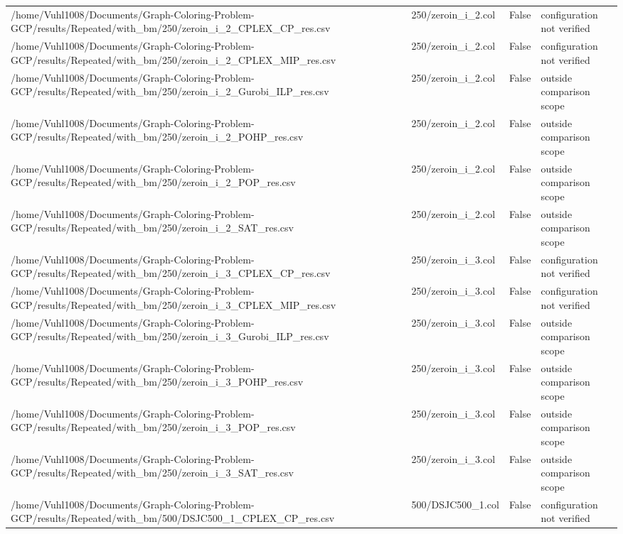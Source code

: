 \begin{table}[htbp]
\begin{tabular}{llll}
/home/Vuhl1008/Documents/Graph-Coloring-Problem-GCP/results/Repeated/with\_bm/250/zeroin\_i\_2\_CPLEX\_CP\_res.csv & 250/zeroin\_i\_2.col & False & configuration not verified \\
/home/Vuhl1008/Documents/Graph-Coloring-Problem-GCP/results/Repeated/with\_bm/250/zeroin\_i\_2\_CPLEX\_MIP\_res.csv & 250/zeroin\_i\_2.col & False & configuration not verified \\
/home/Vuhl1008/Documents/Graph-Coloring-Problem-GCP/results/Repeated/with\_bm/250/zeroin\_i\_2\_Gurobi\_ILP\_res.csv & 250/zeroin\_i\_2.col & False & outside comparison scope \\
/home/Vuhl1008/Documents/Graph-Coloring-Problem-GCP/results/Repeated/with\_bm/250/zeroin\_i\_2\_POHP\_res.csv & 250/zeroin\_i\_2.col & False & outside comparison scope \\
/home/Vuhl1008/Documents/Graph-Coloring-Problem-GCP/results/Repeated/with\_bm/250/zeroin\_i\_2\_POP\_res.csv & 250/zeroin\_i\_2.col & False & outside comparison scope \\
/home/Vuhl1008/Documents/Graph-Coloring-Problem-GCP/results/Repeated/with\_bm/250/zeroin\_i\_2\_SAT\_res.csv & 250/zeroin\_i\_2.col & False & outside comparison scope \\
/home/Vuhl1008/Documents/Graph-Coloring-Problem-GCP/results/Repeated/with\_bm/250/zeroin\_i\_3\_CPLEX\_CP\_res.csv & 250/zeroin\_i\_3.col & False & configuration not verified \\
/home/Vuhl1008/Documents/Graph-Coloring-Problem-GCP/results/Repeated/with\_bm/250/zeroin\_i\_3\_CPLEX\_MIP\_res.csv & 250/zeroin\_i\_3.col & False & configuration not verified \\
/home/Vuhl1008/Documents/Graph-Coloring-Problem-GCP/results/Repeated/with\_bm/250/zeroin\_i\_3\_Gurobi\_ILP\_res.csv & 250/zeroin\_i\_3.col & False & outside comparison scope \\
/home/Vuhl1008/Documents/Graph-Coloring-Problem-GCP/results/Repeated/with\_bm/250/zeroin\_i\_3\_POHP\_res.csv & 250/zeroin\_i\_3.col & False & outside comparison scope \\
/home/Vuhl1008/Documents/Graph-Coloring-Problem-GCP/results/Repeated/with\_bm/250/zeroin\_i\_3\_POP\_res.csv & 250/zeroin\_i\_3.col & False & outside comparison scope \\
/home/Vuhl1008/Documents/Graph-Coloring-Problem-GCP/results/Repeated/with\_bm/250/zeroin\_i\_3\_SAT\_res.csv & 250/zeroin\_i\_3.col & False & outside comparison scope \\
/home/Vuhl1008/Documents/Graph-Coloring-Problem-GCP/results/Repeated/with\_bm/500/DSJC500\_1\_CPLEX\_CP\_res.csv & 500/DSJC500\_1.col & False & configuration not verified \\

\end{tabular}
\end{table}
